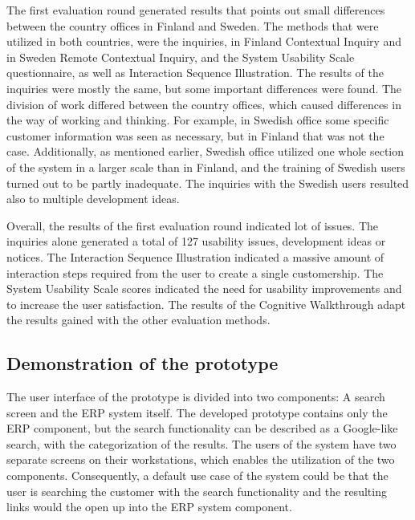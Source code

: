 \documentclass[12pt,a4paper,oneside,pdftex]{report}
\begin{document}
The first evaluation round generated results that points out small differences between the country offices in Finland and Sweden. The methods that were utilized in both countries, were the inquiries, in Finland Contextual Inquiry and in Sweden Remote Contextual Inquiry, and the System Usability Scale questionnaire, as well as Interaction Sequence Illustration. The results of the inquiries were mostly the same, but some important differences were found. The division of work differed between the country offices, which caused differences in the way of working and thinking. For example, in Swedish office some specific customer information was seen as necessary, but in Finland that was not the case. Additionally, as mentioned earlier, Swedish office utilized one whole section of the system in a larger scale than in Finland, and the training of Swedish users turned out to be partly inadequate. The inquiries with the Swedish users resulted also to multiple development ideas. 

Overall, the results of the first evaluation round indicated lot of issues. The inquiries alone generated a total of 127 usability issues, development ideas or notices. The Interaction Sequence Illustration indicated a massive amount of interaction steps required from the user to create a single customership. The System Usability Scale scores indicated the need for usability improvements and to increase the user satisfaction. The results of the Cognitive Walkthrough adapt the results gained with the other evaluation methods. 




\subsection{Demonstration of the prototype}
\label{sec:demoproto}

The user interface of the prototype is divided into two components: A search screen and the ERP system itself. The developed prototype contains only the ERP component, but the search functionality can be described as a Google-like search, with the categorization of the results. The users of the system have two separate screens on their workstations, which enables the utilization of the two components. Consequently, a default use case of the system could be that the user is searching the customer with the search functionality and the resulting links would the open up into the ERP system component. 
\end{document}
